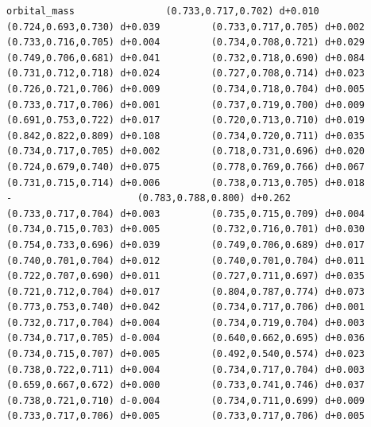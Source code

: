 \documentclass[11pt, letterpaper, openany]{book}
\begin{document}
\begin{empiricalbox}
\begin{lstlisting}[style=terminal]
orbital_mass                (0.733,0.717,0.702) d+0.010         (0.724,0.693,0.730) d+0.039         (0.733,0.717,0.705) d+0.002         (0.733,0.716,0.705) d+0.004         (0.734,0.708,0.721) d+0.029         (0.749,0.706,0.681) d+0.041         (0.732,0.718,0.690) d+0.084         (0.731,0.712,0.718) d+0.024         (0.727,0.708,0.714) d+0.023         (0.726,0.721,0.706) d+0.009         (0.734,0.718,0.704) d+0.005         (0.733,0.717,0.706) d+0.001         (0.737,0.719,0.700) d+0.009         (0.691,0.753,0.722) d+0.017         (0.720,0.713,0.710) d+0.019         (0.842,0.822,0.809) d+0.108         (0.734,0.720,0.711) d+0.035         (0.734,0.717,0.705) d+0.002         (0.718,0.731,0.696) d+0.020         (0.724,0.679,0.740) d+0.075         (0.778,0.769,0.766) d+0.067         (0.731,0.715,0.714) d+0.006         (0.738,0.713,0.705) d+0.018                      -                      (0.783,0.788,0.800) d+0.262         (0.733,0.717,0.704) d+0.003         (0.735,0.715,0.709) d+0.004         (0.734,0.715,0.703) d+0.005         (0.732,0.716,0.701) d+0.030         (0.754,0.733,0.696) d+0.039         (0.749,0.706,0.689) d+0.017         (0.740,0.701,0.704) d+0.012         (0.740,0.701,0.704) d+0.011         (0.722,0.707,0.690) d+0.011         (0.727,0.711,0.697) d+0.035         (0.721,0.712,0.704) d+0.017         (0.804,0.787,0.774) d+0.073         (0.773,0.753,0.740) d+0.042         (0.734,0.717,0.706) d+0.001         (0.732,0.717,0.704) d+0.004         (0.734,0.719,0.704) d+0.003         (0.734,0.717,0.705) d-0.004         (0.640,0.662,0.695) d+0.036         (0.734,0.715,0.707) d+0.005         (0.492,0.540,0.574) d+0.023         (0.738,0.722,0.711) d+0.004         (0.734,0.717,0.704) d+0.003         (0.659,0.667,0.672) d+0.000         (0.733,0.741,0.746) d+0.037         (0.738,0.721,0.710) d-0.004         (0.734,0.711,0.699) d+0.009         (0.733,0.717,0.706) d+0.005         (0.733,0.717,0.706) d+0.005     

\end{lstlisting}
\end{empiricalbox}
\end{document}
